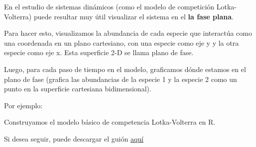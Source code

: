 \documentclass[
]{article}
\begin{document}
En el estudio de sistemas dinámicos (como el modelo de competición
Lotka-Volterra) puede resultar muy útil visualizar el sistema en el
\textbf{la fase plana}.

Para hacer esto, visualizamos la abundancia de cada especie que
interactúa como una coordenada en un plano cartesiano, con una especie
como eje y y la otra especie como eje x. Esta superficie 2-D se llama
plano de fase.

Luego, para cada paso de tiempo en el modelo, graficamos dónde estamos
en el plano de fase (grafica las abundancias de la especie 1 y la
especie 2 como un punto en la superficie cartesiana bidimensional).

Por ejemplo:

Construyamos el modelo básico de competencia Lotka-Volterra en R.

Si desea seguir, puede descargar el guión \href{LECTURE16.R}{aquí}
\end{document}

